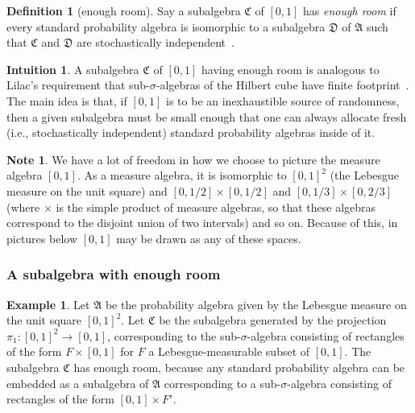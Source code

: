 \documentclass[
  sigconf,
  screen, ]{acmart}
\theoremstyle{definition}
\newtheorem{intuition}[theorem]{Intuition}
\newtheorem{definition}[theorem]{Definition}
\newtheorem{example}[theorem]{Example}
\newtheorem{note}[theorem]{Note}
\newcommand\frakA{\mathfrak A}
\newcommand\frakC{\mathfrak C}
\newcommand\frakD{\mathfrak D}
\newcommand\fremlinf[3]{\cite[\href{https://www1.essex.ac.uk/maths/people/fremlin/chap#2.pdf\#page=#3}{#1}]{fremlin2000measure}}
\newcommand\lilac[2]{\cite[\href{https://johnm.li/lilac.pdf\#page=#2}{#1}]{li2023lilac}}
\newcommand\flavortext{}
\begin{document}
\begin{definition}[enough room] \label{app:def:enough-room}
  Say a subalgebra $\frakC$ of $[0,1]$
  has \emph{enough room}
  if
  every standard probability algebra
  is isomorphic to
  a subalgebra $\frakD$ of $\frakA$
  such that $\frakC$ and $\frakD$
  are
  stochastically independent~\fremlinf{325L}{32}{35}.
\end{definition}

\begin{intuition}
  A subalgebra $\frakC$ of $[0,1]$ having enough room
  is analogous to Lilac's requirement
  that sub-$\sigma$-algebras of the Hilbert cube
  have finite footprint~\lilac{Definition 2.6}{15}.
  The main idea is that, if $[0,1]$ is to be
  an inexhaustible source of randomness,
  then a given subalgebra
  must be small enough that 
  one can always allocate fresh (i.e., stochastically independent)
  standard probability algebras inside of it.
\end{intuition}

\ifdefined\flavortext

\begin{note}
  We have a lot of freedom in how we choose to picture
  the measure algebra $[0,1]$. As a measure algebra, it is
  isomorphic to $[0,1]^2$ (the Lebesgue measure on the unit square)
  and $[0,1/2] \times [0,1/2]$ and $[0,1/3]\times[0,2/3]$
  (where $\times$ is the simple product of measure algebras, so that these algebras
  correspond to the disjoint
  union of two intervals) and so on.
  Because of this, in pictures below $[0,1]$ may be drawn as any of these spaces.
\end{note}

\subsubsection{A subalgebra with enough room}

\begin{example}
  Let $\frakA$ be the probability algebra given by the Lebesgue measure on the unit square $[0,1]^2$.
  Let $\frakC$ be the subalgebra generated by the projection $\pi_1 : [0,1]^2\to[0,1]$,
  corresponding to the sub-$\sigma$-algebra consisting of rectangles of the form
  $F\times [0,1]$ for $F$ a Lebesgue-measurable subset of $[0,1]$.
  The subalgebra $\frakC$ has enough room, because any standard probability algebra
  can be embedded as a subalgebra of $\frakA$
  corresponding to a sub-$\sigma$-algebra consisting of rectangles of the form 
  $[0,1]\times F'$.
\end{example}
\end{document}
